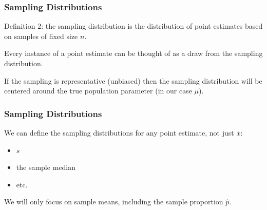 \documentclass[handout]{beamer}
\newcommand{\blue}[1]{\textcolor{blue2}{#1}}
\newcommand{\xbar}{\overline{x}}
\begin{document}
\begin{frame}[fragile]
\frametitle{Sampling Distributions}

\blue{Definition 2}: the \blue{sampling distribution} is the distribution of point estimates based on samples of fixed size $n$.  

\pause \vspace{0.5cm}

Every instance of a point estimate can be thought of as a draw from the sampling distribution.

\pause \vspace{0.5cm}

If the sampling is \blue{representative} (unbiased) then the sampling distribution will be centered around the true population parameter (in our case $\mu$).  

\end{frame}


\begin{frame}[fragile]
\frametitle{Sampling Distributions}

We can define the sampling distributions for \blue{any} point estimate, not just $\xbar$:
\pause \begin{itemize}
\item $s$
\item the sample median
\item etc.
\end{itemize}

\pause We will only focus on sample means, including the sample proportion $\widehat{p}$.

\end{frame}
\end{document}
